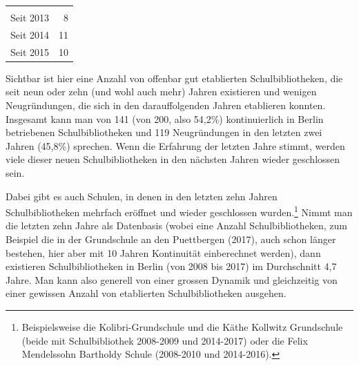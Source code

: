 \documentclass[a4paper,
fontsize=11pt,
oneside,
numbers=noperiodatend,
parskip=half-,
bibliography=totoc,
final
]{scrartcl}
\begin{document}
\begin{longtable}[]{@{}lr@{}}
\begin{minipage}[t]{0.10\columnwidth}
\end{minipage}\tabularnewline
\begin{minipage}[t]{0.42\columnwidth}\raggedright\strut
Seit 2013\strut
\end{minipage} & \begin{minipage}[t]{0.10\columnwidth}\raggedleft\strut
8\strut
\end{minipage}\tabularnewline
\begin{minipage}[t]{0.42\columnwidth}\raggedright\strut
Seit 2014\strut
\end{minipage} & \begin{minipage}[t]{0.10\columnwidth}\raggedleft\strut
11\strut
\end{minipage}\tabularnewline
\begin{minipage}[t]{0.42\columnwidth}\raggedright\strut
Seit 2015\strut
\end{minipage} & \begin{minipage}[t]{0.10\columnwidth}\raggedleft\strut
10\strut
\end{minipage}\tabularnewline
\bottomrule
\end{longtable}

Sichtbar ist hier eine Anzahl von offenbar gut etablierten
Schulbibliotheken, die seit neun oder zehn (und wohl auch mehr) Jahren
existieren und wenigen Neugründungen, die sich in den darauffolgenden
Jahren etablieren konnten. Insgesamt kann man von 141 (von 200, also
54,2\%) kontinuierlich in Berlin betriebenen Schulbibliotheken und 119
Neugründungen in den letzten zwei Jahren (45,8\%) sprechen. Wenn die
Erfahrung der letzten Jahre stimmt, werden viele dieser neuen
Schulbibliotheken in den nächsten Jahren wieder geschlossen sein.

Dabei gibt es auch Schulen, in denen in den letzten zehn Jahren
Schulbibliotheken mehrfach eröffnet und wieder geschlossen
wurden.\footnote{Beispielsweise die Kolibri-Grundschule und die Käthe
  Kollwitz Grundschule (beide mit Schulbibliothek 2008-2009 und
  2014-2017) oder die Felix Mendelssohn Bartholdy Schule (2008-2010 und
  2014-2016).} Nimmt man die letzten zehn Jahre als Datenbasis (wobei
eine Anzahl Schulbibliotheken, zum Beispiel die in der Grundschule an
den Puettbergen (2017), auch schon länger bestehen, hier aber mit 10
Jahren Kontinuität einberechnet werden), dann existieren
Schulbibliotheken in Berlin (von 2008 bis 2017) im Durchschnitt 4,7
Jahre. Man kann also generell von einer grossen Dynamik und gleichzeitig
von einer gewissen Anzahl von etablierten Schulbibliotheken ausgehen.
\end{document}

